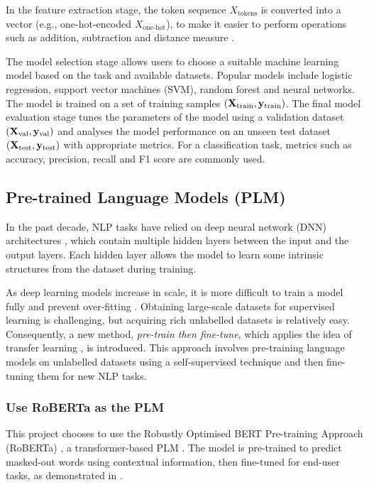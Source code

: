 In the feature extraction stage, the token sequence $X_\text{tokens}$ is converted into a vector (e.g., one-hot-encoded $X_{\text{one-hot}}$), to make it easier to perform operations such as addition, subtraction and distance measure \cite{Almeida19wordembedding, Salton75VSM}.

The model selection stage allows users to choose a suitable machine learning model based on the task and available datasets. Popular models include logistic regression, support vector machines (SVM), random forest and neural networks. The model is trained on a set of training samples $(\bold{X}_{\text{train}}, \bold{y}_{\text{train}})$. The final model evaluation stage tunes the parameters of the model using a validation dataset $(\bold{X}_\text{val}, \bold{y}_\text{val})$ and analyses the model performance on an unseen test dataset $(\bold{X}_\text{test}, \bold{y}_\text{test})$ with appropriate metrics. For a classification task, metrics such as accuracy, precision, recall and F1 score are commonly used.    

\subsection{Pre-trained Language Models (PLM)} 
In the past decade, NLP tasks have relied on deep neural network (DNN) architectures \cite{Yann15dnn}, which contain multiple hidden layers between the input and the output layers. Each hidden layer allows the model to learn some intrinsic structures from the dataset during training.

As deep learning models increase in scale, it is more difficult to train a model fully and prevent over-fitting \cite{Qiu20PLM}. Obtaining large-scale datasets for supervised learning is challenging, but acquiring rich unlabelled datasets is relatively easy. Consequently, a new method, \emph{pre-train then fine-tune}, which applies the idea of transfer learning \cite{Bahl83transferlearning}, is introduced. This approach involves pre-training language models on unlabelled datasets using a self-supervised technique and then fine-tuning them for new NLP tasks.

\subsubsection{Use RoBERTa as the PLM}
This project chooses to use the Robustly Optimised BERT Pre-training Approach (RoBERTa) \cite{Liu19roberta}, a transformer-based PLM \cite{Raffel19PLM}. The model is pre-trained to predict masked-out words using contextual information, then fine-tuned for end-user tasks, as demonstrated in . 



